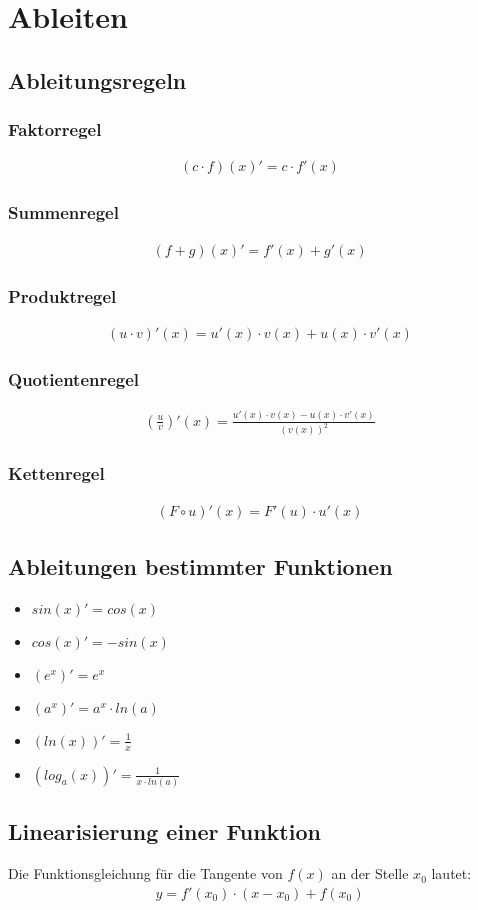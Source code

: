 \section{Ableiten}
\subsection{Ableitungsregeln}
\subsubsection{Faktorregel}
\begin{align*}
    (c \cdot f)(x)' = c \cdot f'(x)
\end{align*}
\subsubsection{Summenregel}
\begin{align*}
    (f+ g)(x)' = f'(x) + g'(x)
\end{align*}
\subsubsection{Produktregel}
\begin{align*}
    (u \cdot v)'(x) = u'(x) \cdot v(x) + u(x) \cdot v'(x)
\end{align*}
\subsubsection{Quotientenregel}
\begin{align*}
    \left(\frac{u}{v}\right)'(x) = \frac{u'(x) \cdot v(x) - u(x) \cdot v'(x)}{(v(x))^2}
\end{align*}
\subsubsection{Kettenregel}
\begin{align*}
    (F \circ u)'(x) = F'(u) \cdot u'(x)
\end{align*}
\subsection{Ableitungen bestimmter Funktionen}
\begin{itemize}
    \item $sin(x)' = cos(x)$
    \item $cos(x)' = -sin(x)$
    \item $(e^x)' = e^x$
    \item $(a^x)' = a^x \cdot ln(a)$
    \item $(ln(x))' = \frac{1}{x}$
    \item $(log_a(x))' = \frac{1}{x \cdot ln(a)}$
\end{itemize}
\subsection{Linearisierung einer Funktion}
Die Funktionsgleichung für die Tangente von $f(x)$ an der Stelle $x_0$ lautet:
\begin{align*}
    y = f'(x_0) \cdot (x - x_0) + f(x_0)
\end{align*}